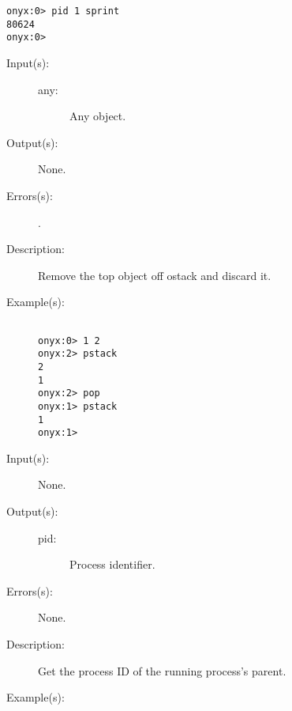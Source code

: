 \begin{description}
\begin{description}
\begin{verbatim}
onyx:0> pid 1 sprint
80624
onyx:0>
		\end{verbatim}
	\end{description}
\label{systemdict:pop}
\item[{\onyxop{any}{pop}{--}}: ]
	\begin{description}\item[]
	\item[Input(s): ]
		\begin{description}\item[]
		\item[any: ]
			Any object.
		\end{description}
	\item[Output(s): ] None.
	\item[Errors(s): ]
		\begin{description}\item[]
		\item[.]
		\end{description}
	\item[Description: ]
		Remove the top object off ostack and discard it.
	\item[Example(s): ]\begin{verbatim}

onyx:0> 1 2
onyx:2> pstack
2
1
onyx:2> pop
onyx:1> pstack
1
onyx:1>
		\end{verbatim}
	\end{description}
\label{systemdict:ppid}
\item[{\onyxop{--}{ppid}{pid}}: ]
	\begin{description}\item[]
	\item[Input(s): ] None.
	\item[Output(s): ]
		\begin{description}\item[]
		\item[pid: ]
			Process identifier.
		\end{description}
	\item[Errors(s): ] None.
	\item[Description: ]
		Get the process ID of the running process's parent.
	\item[Example(s): ]\begin{verbatim}


\end{verbatim}
\end{description}
\end{description}
